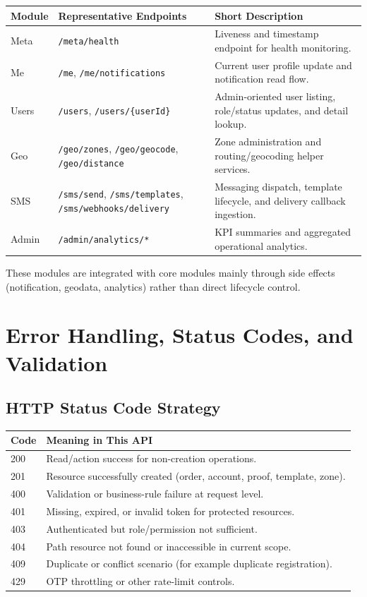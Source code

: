 \begin{tabularx}{\textwidth}{@{}p{2.3cm}p{4.2cm}X@{}}
\toprule
\textbf{Module} & \textbf{Representative Endpoints} & \textbf{Short Description} \\
\midrule
Meta & \texttt{/meta/health} & Liveness and timestamp endpoint for health monitoring. \\
Me & \texttt{/me}, \texttt{/me/notifications} & Current user profile update and notification read flow. \\
Users & \texttt{/users}, \texttt{/users/\{userId\}} & Admin-oriented user listing, role/status updates, and detail lookup. \\
Geo & \texttt{/geo/zones}, \texttt{/geo/geocode}, \texttt{/geo/distance} & Zone administration and routing/geocoding helper services. \\
SMS & \texttt{/sms/send}, \texttt{/sms/templates}, \texttt{/sms/webhooks/delivery} & Messaging dispatch, template lifecycle, and delivery callback ingestion. \\
Admin & \texttt{/admin/analytics/*} & KPI summaries and aggregated operational analytics. \\
\bottomrule
\end{tabularx}

\vspace{6pt}
\noindent These modules are integrated with core modules mainly through side
effects (notification, geodata, analytics) rather than direct lifecycle control.

\section{Error Handling, Status Codes, and Validation}

\subsection{HTTP Status Code Strategy}

\begin{tabularx}{\textwidth}{@{}p{1.8cm}X@{}}
\toprule
\textbf{Code} & \textbf{Meaning in This API} \\
\midrule
200 & Read/action success for non-creation operations. \\
201 & Resource successfully created (order, account, proof, template, zone). \\
400 & Validation or business-rule failure at request level. \\
401 & Missing, expired, or invalid token for protected resources. \\
403 & Authenticated but role/permission not sufficient. \\
404 & Path resource not found or inaccessible in current scope. \\
409 & Duplicate or conflict scenario (for example duplicate registration). \\
429 & OTP throttling or other rate-limit controls. \\
\bottomrule
\end{tabularx}

